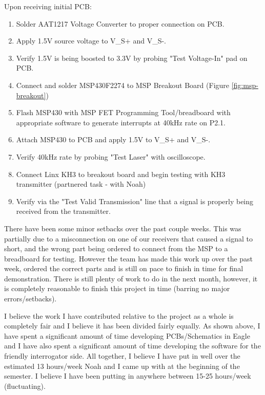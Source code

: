 \documentclass[letterpaper,10pt]{article}
\begin{document}
\begin{spacing}{1.15}
Upon receiving initial PCB:
\begin{enumerate}
	\item Solder AAT1217 Voltage Converter to proper connection on PCB.
	\item Apply 1.5V source voltage to V\_S+ and V\_S-.
	\item Verify 1.5V is being boosted to 3.3V by probing "Test Voltage-In" pad on PCB.
	\item Connect and solder MSP430F2274 to MSP Breakout Board (Figure \ref{fig:msp-breakout})
	\item Flash MSP430 with MSP FET Programming Tool/breadboard with appropriate software to generate interrupts at 40kHz rate on P2.1.
	\item Attach MSP430 to PCB and apply 1.5V to V\_S+ and V\_S-.
	\item Verify 40kHz rate by probing "Test Laser" with oscilloscope.
	\item Connect Linx KH3 to breakout board and begin testing with KH3 transmitter (partnered task - with Noah)
	\item Verify via the "Test Valid Transmission" line that a signal is properly being received from the transmitter. 
	\end{enumerate}

There have been some minor setbacks over the past couple weeks. This was partially due to a misconnection on one of our receivers that caused a signal to short, and the wrong part being ordered to connect from the MSP to a breadboard for testing. However the team has made this work up over the past week, ordered the correct parts and is still on pace to finish in time for final demonstration. There is still plenty of work to do in the next month, however, it is completely reasonable to finish this project in time (barring no major errors/setbacks).

I believe the work I have contributed relative to the project as a whole is completely fair and I believe it has been divided fairly equally. As shown above, I have spent a significant amount of time developing PCBs/Schematics in Eagle and I have also spent a significant amount of time developing the software for the friendly interrogator side. All together, I believe I have put in well over the estimated 13 hours/week Noah and I came up with at the beginning of the semester. I believe I have been putting in anywhere between 15-25 hours/week (fluctuating). 



\clearpage

\end{spacing}
\end{document}

